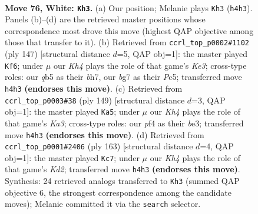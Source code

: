 \documentclass[11pt]{article}
\begin{document}
\clearpage

\begin{figure}[p]\centering
\begin{subfigure}{0.46\textwidth}\centering
\resizebox{\linewidth}{!}{%
\newchessgame
\chessboard[
  setfen={8/2k3b1/8/1q6/5p1K/8/8/8 w - - 0 76},
  showmover=false,
  pgfstyle=straightmove, color=movearrow, markmove={h4-h3}
]}
\caption{}
\end{subfigure}\hfill
\begin{subfigure}{0.46\textwidth}\centering
\resizebox{\linewidth}{!}{%
\newchessgame
\chessboard[
  setfen={8/7B/4k3/2p5/2P4K/8/8/3n4 b - - 0 74},
  showmover=false,
  pgfstyle=straightmove, color=movearrow, markmove={e6-f6}
]}
\caption{}
\end{subfigure}
\\[4pt]
\begin{subfigure}{0.46\textwidth}\centering
\resizebox{\linewidth}{!}{%
\newchessgame
\chessboard[
  setfen={8/6K1/k7/8/8/4B3/8/1Q6 b - - 0 75},
  showmover=false,
  pgfstyle=straightmove, color=movearrow, markmove={a6-a5}
]}
\caption{}
\end{subfigure}\hfill
\begin{subfigure}{0.46\textwidth}\centering
\resizebox{\linewidth}{!}{%
\newchessgame
\chessboard[
  setfen={7Q/3k4/p5K1/8/8/8/8/8 b - - 0 82},
  showmover=false,
  pgfstyle=straightmove, color=movearrow, markmove={d7-c7}
]}
\caption{}
\end{subfigure}
\caption{\textbf{Move 76, White: \texttt{Kh3}.} (a) Our position; Melanie plays \texttt{Kh3} (\texttt{h4h3}). Panels (b)--(d) are the retrieved master positions whose correspondence most drove this move (highest QAP objective among those that transfer to it). (b) Retrieved from \texttt{ccrl\_top\_p0002\#1102} (ply 147) [structural distance $d$=5, QAP obj=1]: the master played \texttt{Kf6}; under $\mu$ our \emph{Kh4} plays the role of that game's \emph{Ke3}; cross-type roles: our \emph{q}b5 as their \emph{b}h7, our \emph{b}g7 as their \emph{P}c5; transferred move \texttt{h4h3} \textbf{(endorses this move)}. (c) Retrieved from \texttt{ccrl\_top\_p0003\#38} (ply 149) [structural distance $d$=3, QAP obj=1]: the master played \texttt{Ka5}; under $\mu$ our \emph{Kh4} plays the role of that game's \emph{Ka3}; cross-type roles: our \emph{p}f4 as their \emph{b}e3; transferred move \texttt{h4h3} \textbf{(endorses this move)}. (d) Retrieved from \texttt{ccrl\_top\_p0001\#2406} (ply 163) [structural distance $d$=4, QAP obj=1]: the master played \texttt{Kc7}; under $\mu$ our \emph{Kh4} plays the role of that game's \emph{Kd2}; transferred move \texttt{h4h3} \textbf{(endorses this move)}. Synthesis: 24 retrieved analogs transferred to \texttt{Kh3} (summed QAP objective 6, the strongest correspondence among the candidate moves); Melanie committed it via the \texttt{search} selector.}
\label{fig:thought-m150}
\end{figure}
\end{document}
